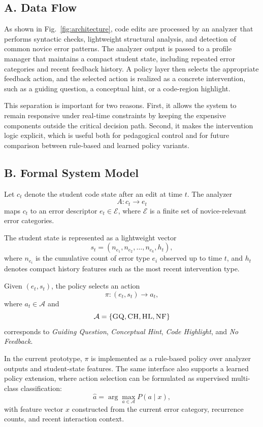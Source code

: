 \documentclass[conference]{IEEEtran}
\begin{document}
\subsection*{A. Data Flow}

As shown in Fig.~\ref{fig:architecture}, code edits are processed by an analyzer that performs syntactic checks, lightweight structural analysis, and detection of common novice error patterns. The analyzer output is passed to a profile manager that maintains a compact student state, including repeated error categories and recent feedback history. A policy layer then selects the appropriate feedback action, and the selected action is realized as a concrete intervention, such as a guiding question, a conceptual hint, or a code-region highlight.

This separation is important for two reasons. First, it allows the system to remain responsive under real-time constraints by keeping the expensive components outside the critical decision path. Second, it makes the intervention logic explicit, which is useful both for pedagogical control and for future comparison between rule-based and learned policy variants.

\subsection*{B. Formal System Model}

Let $c_t$ denote the student code state after an edit at time $t$. The analyzer
\[
A: c_t \rightarrow e_t
\]
maps $c_t$ to an error descriptor $e_t \in \mathcal{E}$, where $\mathcal{E}$ is a finite set of novice-relevant error categories.

The student state is represented as a lightweight vector
\[
s_t = (n_{e_1}, n_{e_2}, \dots, n_{e_k}, h_t),
\]
where $n_{e_i}$ is the cumulative count of error type $e_i$ observed up to time $t$, and $h_t$ denotes compact history features such as the most recent intervention type.

Given $(e_t, s_t)$, the policy selects an action
\[
\pi: (e_t, s_t) \rightarrow a_t,
\]
where $a_t \in \mathcal{A}$ and
\[
\mathcal{A}=\{\textsc{GQ}, \textsc{CH}, \textsc{HL}, \textsc{NF}\}
\]
corresponds to \emph{Guiding Question}, \emph{Conceptual Hint}, \emph{Code Highlight}, and \emph{No Feedback}.

In the current prototype, $\pi$ is implemented as a rule-based policy over analyzer outputs and student-state features. The same interface also supports a learned policy extension, where action selection can be formulated as supervised multi-class classification:
\[
\hat{a} = \arg\max_{a \in \mathcal{A}} P(a \mid x),
\]
with feature vector $x$ constructed from the current error category, recurrence counts, and recent interaction context.
\end{document}
